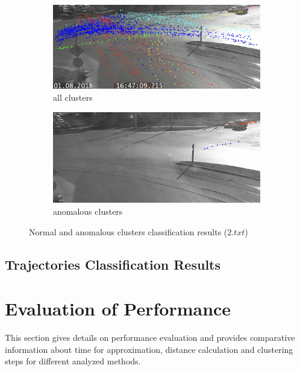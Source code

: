 \begin{figure}[!htb]
	\centering
	\begin{subfigure}[!htb]{0.495\textwidth}
		\centering{}
		\includegraphics[width=\textwidth]{images/cl-classif-norm-2.jpeg}
		\caption{all clusters}
		\label{fig:cl-classif-norm-2}
	\end{subfigure}
	\hfill
	\begin{subfigure}[!htb]{0.495\textwidth}
		\centering{}
		\includegraphics[width=\textwidth]{images/cl-classif-anom-2.jpeg}
		\caption{anomalous clusters}
		\label{fig:cl-classif-anom-2}
	\end{subfigure}
	\caption{Normal and anomalous clusters classification results ($2.txt$)}
	\label{fig:cl-classif-res-2}
\end{figure}

\subsection{Trajectories Classification Results}

\section{Evaluation of Performance}

This section gives details on performance evaluation and provides comparative information about time for approximation, distance calculation and clustering steps for different analyzed methods.

